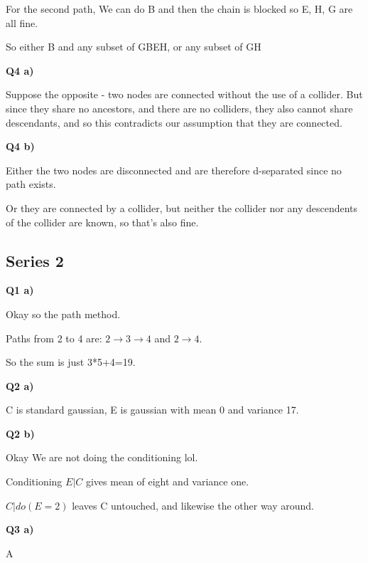 \documentclass{article}
\begin{document}
			For the second  path, We can do B and then the chain is blocked so E, H, G are all fine.
			
			So either B and any subset of GBEH, or any subset of GH
			
		\textbf{Q4 a)}
		
			Suppose the opposite - two nodes are connected without the use of a collider. But since they share no ancestors, and there are no colliders, they also cannot share descendants, and so this contradicts our assumption that they are connected.
			
		\textbf{Q4 b)}
		
			Either the two nodes are disconnected and are therefore d-separated since no path exists.
			
			Or they are connected by a collider, but neither the collider nor any descendents of the collider are known, so that's also fine.
			
	\subsection{Series 2}
	
		\textbf{Q1 a)}
		
			Okay so the path method.
			
			Paths from 2 to 4 are: $2\to3\to4$ and $2\to 4$. 
			
			So the sum is just 3*5+4=19.
			
		\textbf{Q2 a)}
		
			C is standard gaussian, E is gaussian with mean 0 and variance 17.
			
		\textbf{Q2 b)}
		
			Okay We are not doing the conditioning lol.
			
			Conditioning $E|C$ gives mean of eight and variance one.
			
			$C|do(E=2)$ leaves C untouched, and likewise the other way around.
			
			
		\textbf{Q3 a)}
		
			A
	
\end{document}
